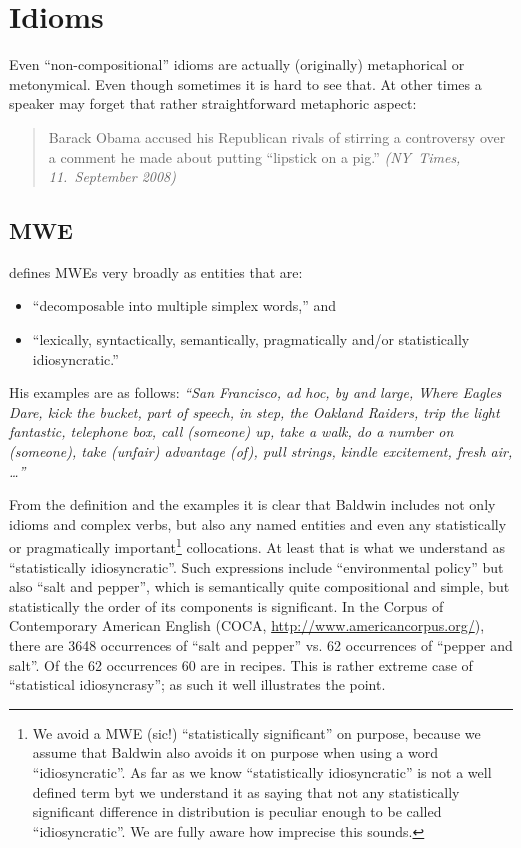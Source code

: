 
\chapter{Idioms}
Even ``non-compositional'' idioms are actually (originally) metaphorical or metonymical.  Even though sometimes it is hard to see that. At other times a speaker may forget that rather straightforward metaphoric aspect:

\begin{quote}
Barack Obama accused his Republican rivals of stirring a controversy over a comment he made about putting “lipstick on a pig.” \emph{(NY~Times, 11.~September 2008)}
\end{quote}



\section{MWE}

\citet{baldwin:2004} defines MWEs very broadly as entities that are:
\begin{itemize}
\item
``decomposable into multiple simplex words,'' and
\item
``lexically, syntactically, semantically, pragmatically and/or statistically idiosyncratic.''
\end{itemize}

His examples are as follows: \emph{``San Francisco, ad hoc, by and large, Where Eagles Dare, kick the bucket, part of speech, in step, the Oakland Raiders, trip the light fantastic, telephone box, call (someone) up, take a walk, do a number on (someone), take (unfair) advantage (of), pull strings, kindle excitement, fresh air, \ldots''}

From the definition and the examples it is clear that Baldwin includes not only idioms and complex verbs, but also any named entities and even any statistically or pragmatically important\footnote{We avoid a MWE (sic!) ``statistically significant'' on purpose, because we assume that Baldwin also avoids it on purpose when using a word ``idiosyncratic''. As far as we know ``statistically idiosyncratic'' is not a well defined term byt we understand it as saying that not any statistically significant difference in distribution is peculiar enough to be called ``idiosyncratic''. We are fully aware how imprecise this sounds.} collocations. At least that is what we understand as ``statistically idiosyncratic''. Such expressions include ``environmental policy'' but also ``salt and pepper'', which is semantically quite compositional and simple, but statistically the order of its components is significant. In the Corpus of Contemporary American English (COCA, \url{http://www.americancorpus.org/}), there are 3648 occurrences of ``salt and pepper'' vs. 62 occurrences of ``pepper and salt''. Of the 62 occurrences 60 are in recipes. This is rather extreme case of ``statistical idiosyncrasy''; as such it well illustrates the point.

